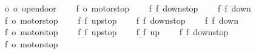 \begin{isabellebody}
\ \ \ \ {\isacharparenleft}{\isacharparenleft}o{}{\isacharcomma}\ o{}{\isacharparenright}{\isacharcomma}\ opendoor{}{\isacharparenright}{\isacharcomma}\isanewline
\isanewline
\ \ \ \ {\isacharparenleft}{\isacharparenleft}f{}{\isacharcomma}\ o{}{\isacharparenright}{\isacharcomma}\ motorstop{}{\isacharparenright}{\isacharcomma}\isanewline
\ \ \ \ {\isacharparenleft}{\isacharparenleft}f{}{\isacharcomma}\ f{}{\isacharparenright}{\isacharcomma}\ down{}{}stop{\isacharparenright}{\isacharcomma}\isanewline
\ \ \ \ {\isacharparenleft}{\isacharparenleft}f{}{\isacharcomma}\ f{}{\isacharparenright}{\isacharcomma}\ down{}{}{\isacharparenright}{\isacharcomma}\isanewline
\isanewline
\ \ \ \ {\isacharparenleft}{\isacharparenleft}f{}{\isacharcomma}\ o{}{\isacharparenright}{\isacharcomma}\ motorstop{}{\isacharparenright}{\isacharcomma}\isanewline
\ \ \ \ {\isacharparenleft}{\isacharparenleft}f{}{\isacharcomma}\ f{}{\isacharparenright}{\isacharcomma}\ up{}{}stop{\isacharparenright}{\isacharcomma}\isanewline
\ \ \ \ {\isacharparenleft}{\isacharparenleft}f{}{\isacharcomma}\ f{}{\isacharparenright}{\isacharcomma}\ down{}{}stop{\isacharparenright}{\isacharcomma}\isanewline
\ \ \ \ {\isacharparenleft}{\isacharparenleft}f{}{\isacharcomma}\ f{}{\isacharparenright}{\isacharcomma}\ down{}{}{\isacharparenright}{\isacharcomma}\isanewline
\isanewline
\ \ \ \ {\isacharparenleft}{\isacharparenleft}f{}{\isacharcomma}\ o{}{\isacharparenright}{\isacharcomma}\ motorstop{}{\isacharparenright}{\isacharcomma}\isanewline
\ \ \ \ {\isacharparenleft}{\isacharparenleft}f{}{\isacharcomma}\ f{}{\isacharparenright}{\isacharcomma}\ up{}{}stop{\isacharparenright}{\isacharcomma}\isanewline
\ \ \ \ {\isacharparenleft}{\isacharparenleft}f{}{\isacharcomma}\ f{}{\isacharparenright}{\isacharcomma}\ up{}{}{\isacharparenright}{\isacharcomma}\isanewline
\ \ \ \ {\isacharparenleft}{\isacharparenleft}f{}{\isacharcomma}\ f{}{\isacharparenright}{\isacharcomma}\ down{}{}stop{\isacharparenright}{\isacharcomma}\isanewline
\isanewline
\ \ \ \ {\isacharparenleft}{\isacharparenleft}f{}{\isacharcomma}\ o{}{\isacharparenright}{\isacharcomma}\ motorstop{}{\isacharparenright}{\isacharcomma}\isanewline

\end{isabellebody}
